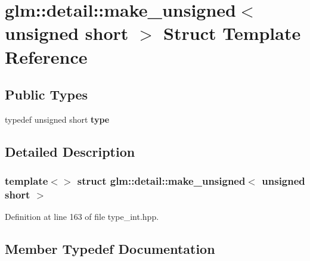 \hypertarget{structglm_1_1detail_1_1make__unsigned_3_01unsigned_01short_01_4}{}\section{glm\+:\+:detail\+:\+:make\+\_\+unsigned$<$ unsigned short $>$ Struct Template Reference}
\label{structglm_1_1detail_1_1make__unsigned_3_01unsigned_01short_01_4}
\subsection*{Public Types}
\begin{DoxyCompactItemize}
\item 
\mbox{\label{structglm_1_1detail_1_1make__unsigned_3_01unsigned_01short_01_4_a42829000435f69c3a00675b6914f0d33}} 
typedef unsigned short {\bfseries type}
\end{DoxyCompactItemize}


\subsection{Detailed Description}
\subsubsection*{template$<$$>$\newline
struct glm\+::detail\+::make\+\_\+unsigned$<$ unsigned short $>$}



Definition at line 163 of file type\+\_\+int.\+hpp.



\subsection{Member Typedef Documentation}
\mbox{\label{structglm_1_1detail_1_1make__unsigned_3_01unsigned_01short_01_4_a42829000435f69c3a00675b6914f0d33}} 
